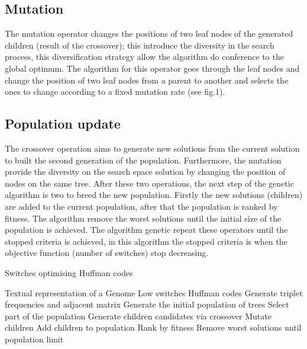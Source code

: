 \documentclass[preprint,12pt]{elsarticle}
\begin{document}
\subsection{Mutation}
The mutation operator changes the positions of two leaf nodes of the generated children (result of the crossover); this introduce the diversity in the search process, this diversification strategy allow the algorithm do conference to the global optimum. The algorithm for this operator goes through the leaf nodes and change the position of two leaf nodes from a parent to another and selects the ones to change according to a fixed mutation rate (see fig.1).
\subsection{Population update}
The crossover operation aims to generate new solutions from the current solution to built the second generation of the population. Furthermore, the mutation provide the diversity on the search space solution by changing the position of  nodes on the same tree. After these two operations, the next step of the genetic algorithm is two to breed the new population. Firstly the new solutions (children) are added to the current population, after that the population is ranked by fitness. The algorithm remove the worst solutions until the initial size of the population is achieved. The algorithm genetic repeat these operators until the stopped criteria is achieved, in this algorithm the stopped criteria is when the objective function (number of switches) stop decreasing.
\begin{algorithm}[!btph]
\caption{Switches optimising Huffman codes}
\label{alg1}
\begin{algorithmic}[1]
\REQUIRE Textual representation of a Genome
\ENSURE Low switches Huffman codes
\STATE Generate triplet frequencies and adjacent matrix 
\STATE Generate the initial  population of trees
\REPEAT 
\STATE Select part of the population
\STATE Generate children candidates via crossover
\STATE Mutate children
\STATE Add children to population
\STATE Rank by fitness
\STATE Remove worst solutions until population limit
\end{algorithmic}
\end{algorithm}
\end{document}
